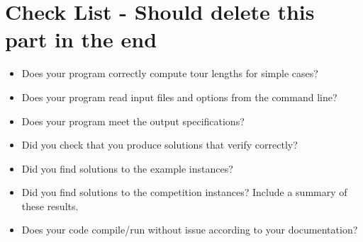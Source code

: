 \documentclass[11pt,letterpaper]{article}
\begin{document}
\section*{Check List - Should delete this part in the end}
\begin{itemize}
	\item Does your program correctly compute tour lengths for simple cases?
	\item Does your program read input files and options from the command line?
	\item Does your program meet the output specifications?
	\item Did you check that you produce solutions that verify correctly?
	\item Did you find solutions to the example instances?
	\item Did you find solutions to the competition instances? Include a summary of these results.
	\item Does your code compile/run without issue according to your documentation?
\end{itemize}
\end{document}
